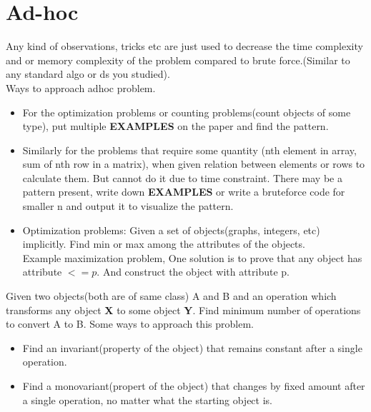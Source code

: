 \documentclass[../Notes.tex]{subfiles}
\begin{document}
\chapter{Ad-hoc}
Any kind of observations, tricks etc are just used to decrease the time complexity and or memory complexity of the problem compared to brute force.(Similar to any standard  algo or ds you studied).\\

Ways to approach adhoc problem.
\begin{itemize}
	\item For the optimization problems or counting problems(count objects of some type), put multiple \textbf{EXAMPLES} on the paper and find the pattern.
	\item Similarly for the problems that require some quantity (nth element in array, sum of nth row in a matrix), when given relation between elements or rows to calculate them. But cannot do it due to time constraint. There may be a pattern present, write down \textbf{EXAMPLES} or write a bruteforce code for smaller n and output it to visualize the pattern.
	\item Optimization problems: Given a set of objects(graphs, integers, etc) implicitly. Find min or max among the attributes of the objects.\\ Example maximization problem, One solution is to prove that any object has attribute $<= p$. And construct the object with attribute p.  
\end{itemize}

Given two objects(both are of same class) A and B and an operation which transforms any object \textbf{X} to some object \textbf{Y}. Find minimum number of operations to convert A to B. Some ways to approach this problem.
\begin{itemize}
	\item Find an invariant(property of the object) that remains constant after a single operation.
	\item Find a monovariant(propert of the object) that changes by fixed amount after a single operation, no matter what the starting object is.
\end{itemize}
\end{document}
